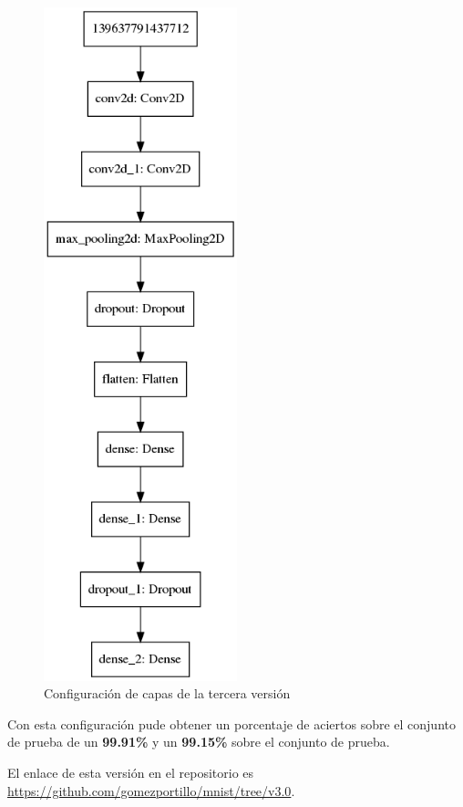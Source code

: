 \begin{figure}[H]
  \centering
  \includegraphics[width=0.5\textwidth]{../images/model-v3}
  \caption{Configuración de capas de la tercera versión}
  \label{fig:capas-v3}
\end{figure}

\bigskip

Con esta configuración pude obtener un porcentaje de aciertos sobre el conjunto de prueba de un \textbf{99.91\%} y un \textbf{99.15\%} sobre el conjunto de prueba.

El enlace de esta versión en el repositorio es \url{https://github.com/gomezportillo/mnist/tree/v3.0}.
